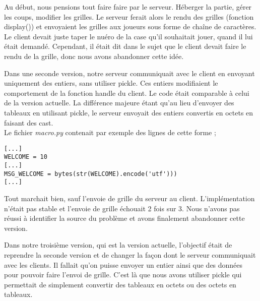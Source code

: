 \documentclass[11pt]{report}
\begin{document}
Au début, nous pensions tout faire faire par le serveur. Héberger la partie,
gérer les coups, modifier les grilles. Le serveur ferait alors le rendu des
grilles (fonction display()) et envoyaient les grilles aux joueurs sous forme
de chaîne de caractères. Le client devait juste taper le nuéro de la case
qu'il souhaitait jouer, quand il lui était demandé.
Cependant, il était dit dans le sujet que le client devait faire le rendu
de la grille, donc nous avons abandonner cette idée.

\vspace{5mm}
\par

Dans une seconde version, notre serveur communiquait avec le client en envoyant
uniquement des entiers, sans utiliser pickle. Ces entiers modifiaient le
comportement de la fonction handle du client. Le code était comparable à
celui de la version actuelle. La différence majeure étant qu'au lieu d'envoyer
des tableaux en utilisant pickle, le serveur envoyait des entiers convertis
en octets en faisant des cast. \\
Le fichier \textit{macro.py} contenait par exemple des lignes de cette forme ;

\begin{verbatim}
[...]
WELCOME = 10
[...]
MSG_WELCOME = bytes(str(WELCOME).encode('utf')))
[...]
\end{verbatim}

Tout marchait bien, sauf l'envoie de grille du serveur au client.
L'implémentation n'était pas stable et l'envoie de grille échouait
2 fois sur 3. Nous n'avons pas réussi à identifier la source du problème et
avons finalement abandonner cette version.

\vspace{5mm}
\par

Dans notre troisième version, qui est la version actuelle, l'objectif était
de reprendre la seconde version et de changer la façon dont le serveur
communiquait avec les clients. Il fallait qu'on puisse envoyer un entier ainsi
que des données pour pouvoir faire l'envoi de grille. C'est là que nous avons
utiliser pickle qui permettait de simplement convertir des tableaux en octets
ou des octets en tableaux.


\newpage
\end{document}
